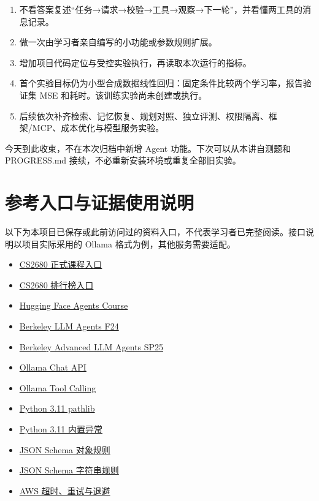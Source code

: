\begin{enumerate}
\item 不看答案复述“任务→请求→校验→工具→观察→下一轮”，并看懂两工具的消息记录。
\item 做一次由学习者亲自编写的小功能或参数规则扩展。
\item 增加项目代码定位与受控实验执行，再读取本次运行的指标。
\item 首个实验目标仍为小型合成数据线性回归：固定条件比较两个学习率，报告验证集 MSE 和耗时。该训练实验尚未创建或执行。
\item 后续依次补齐检索、记忆恢复、规划对照、独立评测、权限隔离、框架/MCP、成本优化与模型服务实验。
\end{enumerate}

今天到此收束，不在本次归档中新增 Agent 功能。下次可以从本讲自测题和 PROGRESS.md 接续，不必重新安装环境或重复全部旧实验。

\section{参考入口与证据使用说明}

以下为本项目已保存或此前访问过的资料入口，不代表学习者已完整阅读。接口说明以项目实际采用的 Ollama 格式为例，其他服务需要适配。

\begin{itemize}
\item \href{https://cs2680.com/}{CS2680 正式课程入口}
\item \href{https://leaderboard.cs2680.com/}{CS2680 排行榜入口}
\item \href{https://huggingface.co/learn/agents-course/en/unit0/introduction}{Hugging Face Agents Course}
\item \href{https://llmagents-learning.org/f24}{Berkeley LLM Agents F24}
\item \href{https://llmagents-learning.org/sp25}{Berkeley Advanced LLM Agents SP25}
\item \href{https://docs.ollama.com/api/chat}{Ollama Chat API}
\item \href{https://docs.ollama.com/capabilities/tool-calling}{Ollama Tool Calling}
\item \href{https://docs.python.org/3.11/library/pathlib.html}{Python 3.11 pathlib}
\item \href{https://docs.python.org/3.11/library/exceptions.html}{Python 3.11 内置异常}
\item \href{https://json-schema.org/understanding-json-schema/reference/object}{JSON Schema 对象规则}
\item \href{https://json-schema.org/understanding-json-schema/reference/string}{JSON Schema 字符串规则}
\item \href{https://aws.amazon.com/builders-library/timeouts-retries-and-backoff-with-jitter/}{AWS 超时、重试与退避}
\end{itemize}

